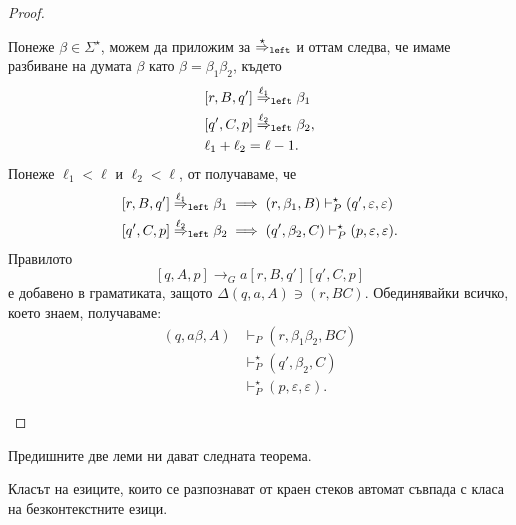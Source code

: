 \begin{proof}
\begin{description}
\begin{itemize}
      \begin{prooftree}
      \end{prooftree}
      Понеже $\beta \in \Sigma^\star$, можем да приложим  за $\lderive{\star}$ и оттам следва,
      че имаме разбиване на думата $\beta$ като $\beta = \beta_1\beta_2$, където 
      \begin{align*}
        & [r,B,q'] \lderive{\ell_1} \beta_1\\
        & [q',C,p] \lderive{\ell_2} \beta_2,\\
        & \ell_1 + \ell_2 = \ell - 1.
      \end{align*}
      Понеже $\ell_1 < \ell$ и $\ell_2 < \ell$, от \IndHyp получаваме, че 
      \begin{align*}
        & [r,B,q'] \lderive{\ell_1} \beta_1 \implies (r,\beta_1,B) \vdash^\star_P (q',\varepsilon,\varepsilon) \\
        & [q',C,p] \lderive{\ell_2} \beta_2 \implies (q',\beta_2,C) \vdash^\star_P (p,\varepsilon,\varepsilon).
      \end{align*}
      Правилото
      \[[q,A,p] \rightarrow_G a[r,B,q'][q',C,p]\]
      е добавено в граматиката, защото $\Delta(q,a,A) \ni (r, BC)$. 
      Обединявайки всичко, което знаем, получаваме:
      \begin{align*}
        (q, a\beta, A) & \vdash_P (r, \beta_1\beta_2, BC)\\
                       & \vdash^\star_P (q', \beta_2, C)\\
                       & \vdash^\star_P (p, \varepsilon, \varepsilon).
      \end{align*}    
    \end{itemize}
  \end{description}
\end{proof}

Предишните две леми ни дават следната теорема.
\begin{important}
  \begin{theorem}
    \label{th:push-down-context-free}
    Класът на езиците, които се разпознават от краен стеков автомат съвпада с
    класа на безконтекстните езици.
  \end{theorem}
\end{important}


